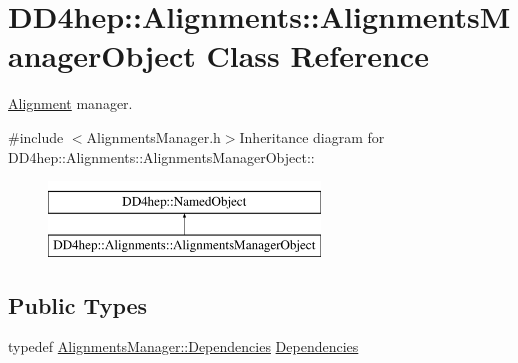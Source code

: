 \hypertarget{class_d_d4hep_1_1_alignments_1_1_alignments_manager_object}{
\section{DD4hep::Alignments::AlignmentsManagerObject Class Reference}
\label{class_d_d4hep_1_1_alignments_1_1_alignments_manager_object}
}


\hyperlink{class_d_d4hep_1_1_alignments_1_1_alignment}{Alignment} manager.  


{\ttfamily \#include $<$AlignmentsManager.h$>$}Inheritance diagram for DD4hep::Alignments::AlignmentsManagerObject::\begin{figure}[H]
\begin{center}
\leavevmode
\includegraphics[height=2cm]{class_d_d4hep_1_1_alignments_1_1_alignments_manager_object}
\end{center}
\end{figure}
\subsection*{Public Types}
\begin{DoxyCompactItemize}
\item 
typedef \hyperlink{class_d_d4hep_1_1_conditions_1_1_conditions_dependency_collection}{AlignmentsManager::Dependencies} \hyperlink{class_d_d4hep_1_1_alignments_1_1_alignments_manager_object_a833ee244e731bbe8cf28bb209181dabc}{Dependencies}
\end{DoxyCompactItemize}
